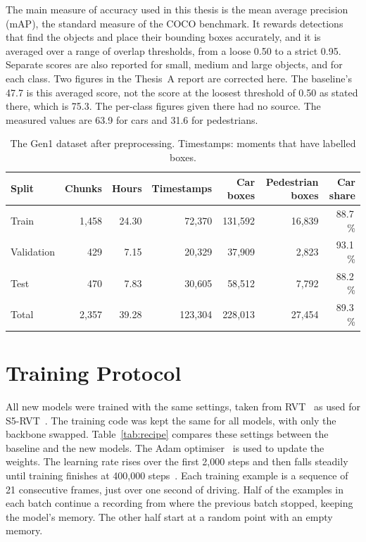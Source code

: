\documentclass[11pt, a4paper]{report}
\begin{document}
The main measure of accuracy used in this thesis is the mean average precision (mAP), the standard
measure of the COCO benchmark. It rewards detections that find the objects and place their bounding boxes
accurately, and it is averaged over a range of overlap thresholds, from a loose 0.50 to a strict 0.95.
Separate scores are also reported for small, medium and large objects, and for each class. Two figures in
the Thesis~A report are corrected here. The baseline's 47.7 is this averaged score, not the score at the
loosest threshold of 0.50 as stated there, which is 75.3. The per-class figures given there had no source. The measured values are 63.9 for cars and 31.6 for pedestrians.

\begin{table}[htbp]
\centering
\small
\caption[The Gen1 dataset]{The Gen1 dataset after preprocessing. Timestamps: moments that have labelled boxes.}
\label{tab:gen1_stats}
\begin{tabular}{lrrrrrr}
\toprule
Split & Chunks & Hours & Timestamps & Car boxes & Pedestrian boxes & Car share \\
\midrule
Train      & 1{,}458 & 24.30 &  72{,}370 & 131{,}592 & 16{,}839 & 88.7\,\% \\
Validation &     429 &  7.15 &  20{,}329 &  37{,}909 &  2{,}823 & 93.1\,\% \\
Test       &     470 &  7.83 &  30{,}605 &  58{,}512 &  7{,}792 & 88.2\,\% \\
\midrule
Total      & 2{,}357 & 39.28 & 123{,}304 & 228{,}013 & 27{,}454 & 89.3\,\% \\
\bottomrule
\end{tabular}
\end{table}

\section{Training Protocol}
\label{sec:training}
All new models were trained with the same settings, taken from RVT~\cite{gehrig2023recurrent} as used for
S5-RVT~\cite{zubic2024state}. The training code was kept the same for all models, with only the backbone
swapped. Table~\ref{tab:recipe} compares these settings between the baseline and the new models. The Adam
optimiser~\cite{kingma2015adam} is used to update the weights. The learning rate rises over the first
2{,}000 steps and then falls steadily until training finishes at 400{,}000 steps~\cite{smith2017super}.
Each training example is a sequence of 21 consecutive frames, just over one second of driving. Half of the
examples in each batch continue a recording from where the previous batch stopped, keeping the model's
memory. The other half start at a random point with an empty memory.
\end{document}
